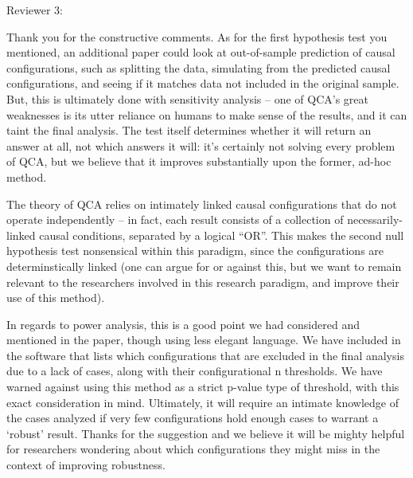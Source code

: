 \documentclass[12pt,stdletter,dateno,sigleft]{newlfm} %
\begin{document}
\begin{newlfm}
Reviewer 3: 

Thank you for the constructive comments. As for the first hypothesis test you mentioned, an additional paper could look at out-of-sample prediction of causal configurations, such as splitting the data, simulating from the predicted causal configurations, and seeing if it matches data not included in the original sample. But, this is ultimately done with sensitivity analysis -- one of QCA's great weaknesses is its utter reliance on humans to make sense of the results, and it can taint the final analysis. The test itself determines whether it will return an answer at all, not which answers it will: it's certainly not solving every problem of QCA, but we believe that it improves substantially upon the former, ad-hoc method. 

The theory of QCA relies on intimately linked causal configurations that do not operate independently -- in fact, each result consists of a collection of necessarily-linked causal conditions, separated by a logical ``OR''. This makes the second null hypothesis test nonsensical within this paradigm, since the configurations are determinstically linked (one can argue for or against this, but we want to remain relevant to the researchers involved in this research paradigm, and improve their use of this method). 

In regards to power analysis, this is a good point we had considered and mentioned in the paper, though using less elegant language. We have included in the software that lists which configurations that are excluded in the final analysis due to a lack of cases, along with their configurational n thresholds. We have warned against using this method as a strict p-value type of threshold, with this exact consideration in mind. Ultimately, it will require an intimate knowledge of the cases analyzed if very few configurations hold enough cases to warrant a `robust' result. Thanks for the suggestion and we believe it will be mighty helpful for researchers wondering about which configurations they might miss in the context of improving robustness.  \newline




\end{newlfm}
\end{document}
